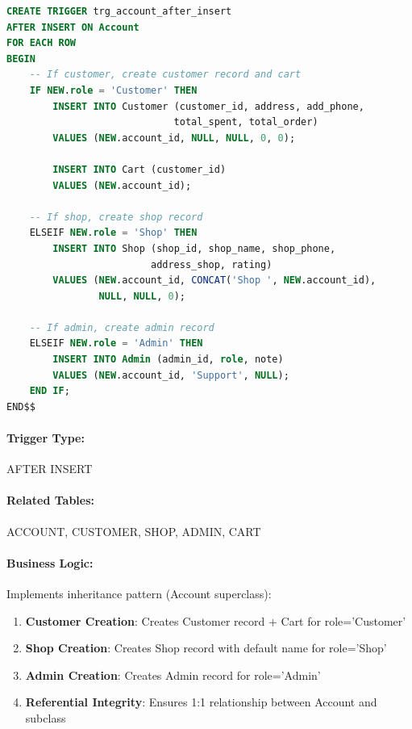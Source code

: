 \begin{lstlisting}[language=SQL, caption=Trigger: trg\_account\_after\_insert, label=lst:trg_account_after]
CREATE TRIGGER trg_account_after_insert
AFTER INSERT ON Account
FOR EACH ROW
BEGIN
    -- If customer, create customer record and cart
    IF NEW.role = 'Customer' THEN
        INSERT INTO Customer (customer_id, address, add_phone, 
                             total_spent, total_order)
        VALUES (NEW.account_id, NULL, NULL, 0, 0);
        
        INSERT INTO Cart (customer_id)
        VALUES (NEW.account_id);
    
    -- If shop, create shop record
    ELSEIF NEW.role = 'Shop' THEN
        INSERT INTO Shop (shop_id, shop_name, shop_phone, 
                         address_shop, rating)
        VALUES (NEW.account_id, CONCAT('Shop ', NEW.account_id), 
                NULL, NULL, 0);
    
    -- If admin, create admin record
    ELSEIF NEW.role = 'Admin' THEN
        INSERT INTO Admin (admin_id, role, note)
        VALUES (NEW.account_id, 'Support', NULL);
    END IF;
END$$
\end{lstlisting}

\paragraph{Trigger Type:} AFTER INSERT

\paragraph{Related Tables:} ACCOUNT, CUSTOMER, SHOP, ADMIN, CART

\paragraph{Business Logic:}
Implements inheritance pattern (Account superclass):
\begin{enumerate}
    \item \textbf{Customer Creation}: Creates Customer record + Cart for role='Customer'
    \item \textbf{Shop Creation}: Creates Shop record with default name for role='Shop'
    \item \textbf{Admin Creation}: Creates Admin record for role='Admin'
    \item \textbf{Referential Integrity}: Ensures 1:1 relationship between Account and subclass
\end{enumerate}

